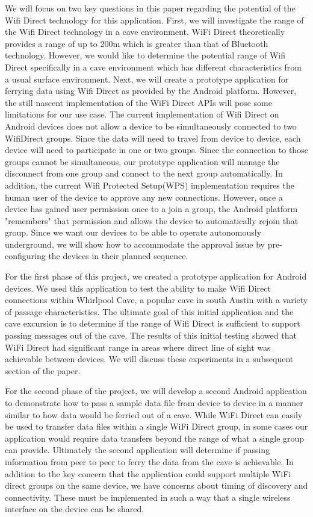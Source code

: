 \documentclass[10pt,twocolumn]{article}
\begin{document}
We will focus on two key questions in this paper regarding the potential of the Wifi Direct technology for this application.
First, we will investigate the range of the Wifi Direct technology in a cave environment.
WiFi Direct theoretically provides a range of up to 200m which is greater than that of Bluetooth technology. 
However, we would like to determine the potential range of Wifi Direct specifically in a cave environment which has different characteristics from a usual surface environment. 
Next, we will create a prototype application for ferrying data using Wifi Direct as provided by the Android platform. 
However, the still nascent implementation of the WiFi Direct APIs will pose some limitations for our use case.
The current implementation of Wifi Direct on Android devices does not allow a device to be simultaneously connected to two WifiDirect groups.
Since the data will need to travel from device to device, each device will need to participate in one or two groups. 
Since the connection to those groups cannot be simultaneous, our prototype application will manage the disconnect from one group and connect to the next group automatically.
In addition, the current Wifi Protected Setup(WPS) implementation requires the human user of the device to approve any new connections.
However, once a device has gained user permission once to a join a group, the Android platform "remembers" that permission and allows the device to automatically rejoin that group.
Since we want our devices to be able to operate autonomously underground, we will show how to accommodate the approval issue by pre-configuring the devices in their planned sequence.
 
For the first phase of this project, we created a prototype application for Android devices. 
We used this application to test the ability to make Wifi Direct connections within Whirlpool Cave, a popular cave in south Austin with a variety of passage characteristics. 
The ultimate goal of this initial application and the cave excursion is to determine if the range of Wifi Direct is sufficient to support passing messages out of the cave.
The results of this initial testing showed that WiFi Direct had significant range in areas where direct line of sight was achievable between devices.
We will discuss these experiments in a subsequent section of the paper.

For the second phase of the project, we will develop a second Android application to demonstrate how to pass a sample data file from device to device in a manner similar to how data would be ferried out of a cave.
While WiFi Direct can easily be used to transfer data files within a single WiFi Direct group, in some cases our application would require data transfers beyond the range of what a single group can provide.
Ultimately the second application will determine if passing information from peer to peer to ferry the data from the cave is achievable. 
In addition to the key concern that the application could support multiple WiFi direct groups on the same device, we have concerns about timing of discovery and connectivity.
These must be implemented in such a way that a single wireless interface on the device can be shared.
\end{document}
